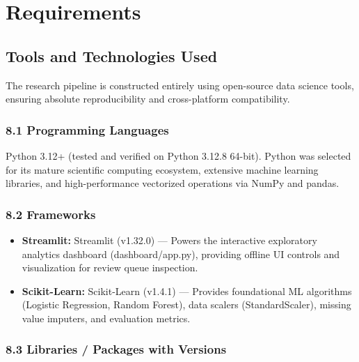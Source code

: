 \chapter{Requirements}

\section{Tools and Technologies Used}

The research pipeline is constructed entirely using open-source data science tools, ensuring absolute reproducibility and cross-platform compatibility.

\subsection{8.1 Programming Languages}

Python 3.12+ (tested and verified on Python 3.12.8 64-bit). Python was selected for its mature scientific computing ecosystem, extensive machine learning libraries, and high-performance vectorized operations via NumPy and pandas.

\subsection{8.2 Frameworks}

\begin{itemize}
\item \textbf{Streamlit:} Streamlit (v1.32.0) --- Powers the interactive exploratory analytics dashboard (dashboard/app.py), providing offline UI controls and visualization for review queue inspection.
\item \textbf{Scikit-Learn:} Scikit-Learn (v1.4.1) --- Provides foundational ML algorithms (Logistic Regression, Random Forest), data scalers (StandardScaler), missing value imputers, and evaluation metrics.
\end{itemize}

\subsection{8.3 Libraries / Packages with Versions}

